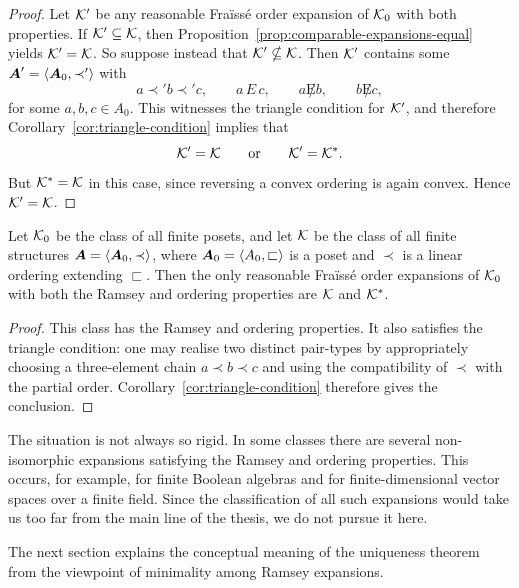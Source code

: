 \begin{proof}
    Let \(\mathcal{K}'\) be any reasonable Fraïssé order expansion of \(\mathcal{K}_0\) with
    both properties. If \(\mathcal{K}'\subseteq \mathcal{K}\),
    then Proposition~\ref{prop:comparable-expansions-equal} yields
    \(\mathcal{K}'=\mathcal{K}\).
    So suppose instead that \(\mathcal{K}'\nsubseteq \mathcal{K}\). Then \(\mathcal{K}'\) contains some
    \(\boldsymbol{A}'=\langle \boldsymbol{A}_0,\prec'\rangle\)
    with
    \[
        a\prec' b\prec' c,
        \qquad
        a\,E\,c,
        \qquad
        a\not E b,
        \qquad
        b\not E c,
    \]
    for some \(a,b,c\in A_0\). This witnesses the triangle condition for \(\mathcal{K}'\), and therefore Corollary~\ref{cor:triangle-condition} implies that
    \[
        \mathcal{K}'=\mathcal{K}
        \qquad\text{or}\qquad
        \mathcal{K}'=\mathcal{K}^*.
    \]
    But \(\mathcal{K}^*=\mathcal{K}\) in this case, since reversing a convex ordering is again
    convex. Hence \(\mathcal{K}'=\mathcal{K}\).
\end{proof}

\begin{example}
    Let \(\mathcal{K}_0\) be the class of all finite posets, and let \(\mathcal{K}\) be the class of
    all finite structures \(\boldsymbol{A}=\langle \boldsymbol{A}_0,\prec\rangle\), where
    \(\boldsymbol{A}_0=\langle A_0,\sqsubset\rangle\) is a poset and \(\prec\) is a linear ordering extending \(\sqsubset\). Then the only reasonable Fraïssé order expansions of \(\mathcal{K}_0\) with both the Ramsey and ordering properties are \(\mathcal{K}\) and \(\mathcal{K}^*\).
\end{example}

\begin{proof}
    This class has the Ramsey and ordering properties. It also satisfies the
    triangle condition: one may realise two distinct pair-types by appropriately
    choosing a three-element chain \(a\prec b\prec c\)
    and using the compatibility of \(\prec\) with the partial order. Corollary~\ref{cor:triangle-condition} therefore gives the conclusion.
\end{proof}

The situation is not always so rigid. In some classes there are several non-isomorphic expansions satisfying the Ramsey and ordering properties. This occurs, for example, for finite Boolean algebras and for finite-dimensional vector spaces over a finite field. Since the classification of all such expansions would take us too far from the main line of the thesis, we do not pursue it here.

The next section explains the conceptual meaning of the uniqueness theorem from the viewpoint of minimality among Ramsey expansions.

